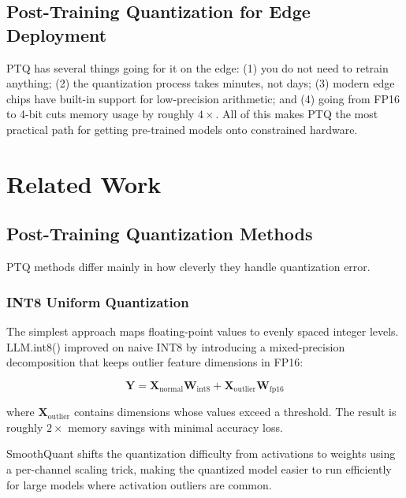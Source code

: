 \documentclass[journal]{IEEEtran}
\begin{document}
\subsection{Post-Training Quantization for Edge Deployment}

PTQ has several things going for it on the edge: (1) you do not need to retrain anything; (2) the quantization process takes minutes, not days; (3) modern edge chips have built-in support for low-precision arithmetic; and (4) going from FP16 to 4-bit cuts memory usage by roughly $4\times$. All of this makes PTQ the most practical path for getting pre-trained models onto constrained hardware.

\section{Related Work}

\subsection{Post-Training Quantization Methods}

PTQ methods differ mainly in how cleverly they handle quantization error.

\subsubsection{INT8 Uniform Quantization}

The simplest approach maps floating-point values to evenly spaced integer levels. LLM.int8() \cite{dettmers2022llm} improved on naive INT8 by introducing a mixed-precision decomposition that keeps outlier feature dimensions in FP16:

\begin{equation}
\mathbf{Y} = \mathbf{X}_{\text{normal}} \mathbf{W}_{\text{int8}} + \mathbf{X}_{\text{outlier}} \mathbf{W}_{\text{fp16}}
\end{equation}

where $\mathbf{X}_{\text{outlier}}$ contains dimensions whose values exceed a threshold. The result is roughly $2\times$ memory savings with minimal accuracy loss.

SmoothQuant \cite{xiao2023smoothquant} shifts the quantization difficulty from activations to weights using a per-channel scaling trick, making the quantized model easier to run efficiently for large models where activation outliers are common.
\end{document}
